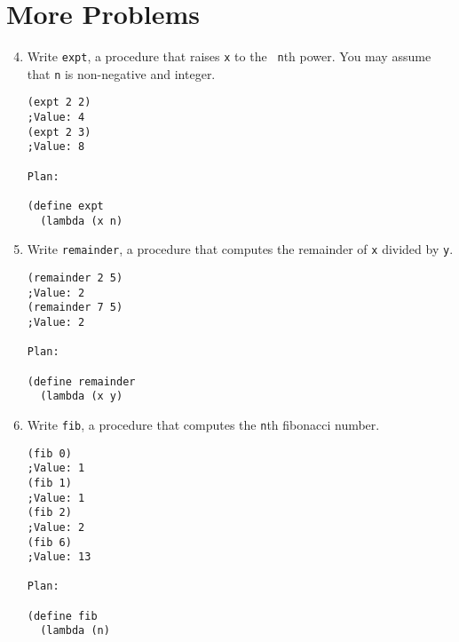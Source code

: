 \section*{More Problems}
\begin{enumerate}
\setcounter{enumi}{3}
\item Write {\tt expt}, a procedure that raises {\tt x} to the {\tt
n}th power.  You may assume that {\tt n} is non-negative and integer.
\begin{verbatim}
(expt 2 2)
;Value: 4
(expt 2 3)
;Value: 8

Plan:

(define expt
  (lambda (x n)
\end{verbatim}
\vspace{1in}

\newpage
\item Write {\tt remainder}, a procedure that computes the remainder
of {\tt x} divided by {\tt y}.
\begin{verbatim}
(remainder 2 5)
;Value: 2
(remainder 7 5)
;Value: 2

Plan:

(define remainder
  (lambda (x y)
\end{verbatim}
\vspace{1in}

\item Write {\tt fib}, a procedure that computes the {\tt n}th
fibonacci number.
\begin{verbatim}
(fib 0)
;Value: 1
(fib 1)
;Value: 1
(fib 2)
;Value: 2
(fib 6)
;Value: 13

Plan:

(define fib
  (lambda (n)
\end{verbatim}
\vspace{1in}

\end{enumerate}


